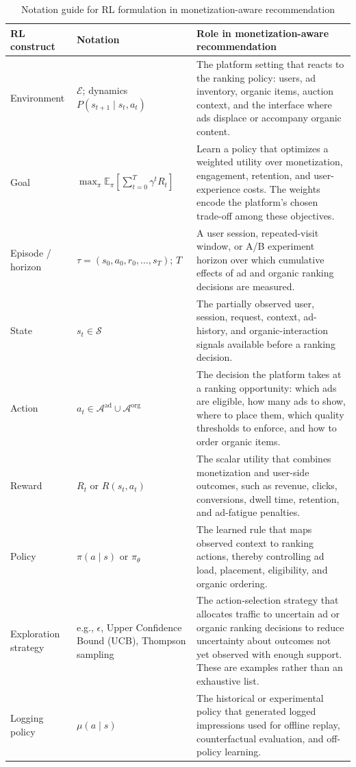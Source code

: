 \documentclass[manuscript,review,screen]{acmart}
\begin{document}
\begin{table}[!t]
    \centering
    \footnotesize
    \setlength{\tabcolsep}{3pt}
    \renewcommand{\arraystretch}{1.12}
    \begin{tabularx}{\textwidth}{@{}>{\raggedright\arraybackslash}p{}>{\raggedright\arraybackslash}p{}>{\raggedright\arraybackslash}X@{}}
        \toprule
        RL construct & Notation & Role in monetization-aware recommendation \\
        \midrule
        Environment & $\mathcal{E}$; dynamics $P(s_{t+1}\mid s_t,a_t)$ & The platform setting that reacts to the ranking policy: users, ad inventory, organic items, auction context, and the interface where ads displace or accompany organic content. \\
        Goal & $\max_\pi \mathbb{E}_\pi[\sum_{t=0}^{T}\gamma^tR_t]$ & Learn a policy that optimizes a weighted utility over monetization, engagement, retention, and user-experience costs. The weights encode the platform's chosen trade-off among these objectives. \\
        Episode / horizon & $\tau=(s_0,a_0,r_0,\ldots,s_T)$; $T$ & A user session, repeated-visit window, or A/B experiment horizon over which cumulative effects of ad and organic ranking decisions are measured. \\
        State & $s_t \in \mathcal{S}$ & The partially observed user, session, request, context, ad-history, and organic-interaction signals available before a ranking decision. \\
        Action & $a_t \in \mathcal{A}^{\mathrm{ad}} \cup \mathcal{A}^{\mathrm{org}}$ & The decision the platform takes at a ranking opportunity: which ads are eligible, how many ads to show, where to place them, which quality thresholds to enforce, and how to order organic items. \\
        Reward & $R_t$ or $R(s_t,a_t)$ & The scalar utility that combines monetization and user-side outcomes, such as revenue, clicks, conversions, dwell time, retention, and ad-fatigue penalties. \\
        Policy & $\pi(a\mid s)$ or $\pi_\theta$ & The learned rule that maps observed context to ranking actions, thereby controlling ad load, placement, eligibility, and organic ordering. \\
        Exploration strategy & e.g., $\epsilon$, Upper Confidence Bound (UCB), Thompson sampling & The action-selection strategy that allocates traffic to uncertain ad or organic ranking decisions to reduce uncertainty about outcomes not yet observed with enough support. These are examples rather than an exhaustive list. \\
        Logging policy & $\mu(a\mid s)$ & The historical or experimental policy that generated logged impressions used for offline replay, counterfactual evaluation, and off-policy learning. \\
        \bottomrule
    \end{tabularx}
    \caption{Notation guide for RL formulation in monetization-aware recommendation}
    \label{tab:comparison}
\end{table}
\end{document}
